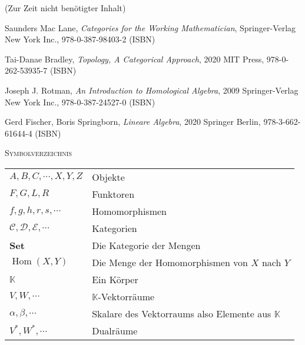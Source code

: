 \documentclass[a4paper]{amsart}
\theoremstyle{definition}
\DeclareMathOperator{\Hom}{Hom}
\newcommand{\K}{\ensuremath{\mathbb{ K }}}
\begin{document}
\begin{backup}
    (Zur Zeit nicht benötigter Inhalt)
\end{backup}

\begin{thebibliography}{9}

      Saunders Mac Lane, \emph{Categories for the Working Mathematician},
      Springer-Verlag New York Inc., 978-0-387-98403-2 (ISBN)
      
      Tai-Danae Bradley, \emph{Topology, A Categorical Approach},
      2020 MIT Press, 978-0-262-53935-7 (ISBN)

   	Joseph J. Rotman, \emph{An Introduction to Homological Algebra},
   	2009 Springer-Verlag New York Inc., 978-0-387-24527-0 (ISBN)
      
     Gerd Fischer, Boris Springborn, \emph{Lineare Algebra},
     2020 Springer Berlin, 978-3-662-61644-4 (ISBN)

\end{thebibliography}

\begin{large}
    \centerline{\textsc{Symbolverzeichnis}}
\end{large}
\bigskip

\renewcommand*{\arraystretch}{1}

\begin{tabular}{ll}
    $A, B, C, \cdots, X, Y, Z$          & Objekte\\
    $F,G,L,R$ & Funktoren\\
    $f, g, h, r, s, \cdots$   & Homomorphismen\\
    $\mathcal C, \mathcal D, \mathcal E, \cdots$ & Kategorien\\
    \textbf{Set} & Die Kategorie der Mengen\\
    $\Hom( X, Y)$ & Die Menge der Homomorphismen von $X$ nach $Y$\\
    $\K$         &Ein Körper\\
    $V, W, \cdots$ &$\K$-Vektorräume\\
    $\alpha, \beta, \cdots$ & Skalare des Vektorraums also Elemente aus $\K$\\
    $V^*, W^*, \cdots$ & Dualräume
\end{tabular}
\end{document}
